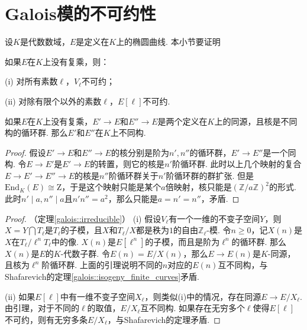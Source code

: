 \section{Galois模的不可约性}

设$K$是代数数域，$E$是定义在$K$上的椭圆曲线. 本小节要证明

\begin{cthm}
    如果$E$在$K$上没有复乘，则：

    (i) 对所有素数$\ell$，$V_{\ell}$不可约；

    (ii) 对除有限个以外的素数$\ell$，$E[\ell]$不可约.
    \label{galois::irreducible}
\end{cthm}

\begin{clem}
    如果$E$在$K$上没有复乘，$E'\to E$和$E''\to E$是两个定义在$K$上的同源，且核是不同构的循环群. 那么$E'$和$E''$在$K$上不同构.
\end{clem}

\begin{proof}
    假设$E'\to E$和$E''\to E$的核分别是阶为$n', n''$的循环群，$E'\to E''$是一个同构. 令$E\to E'$是$E'\to E$的转置，则它的核是$n'$阶循环群. 此时以上几个映射的复合$E\to E'\to E''\to E$的核是$n''$阶循环群关于$n'$阶循环群的群扩张. 但是$\mathrm{End}_K(E) \cong \mathrm{Z}$，于是这个映射只能是某个$a$倍映射，核只能是$(\mathbb{Z}/a\mathbb{Z})^2$的形式. 此时$n'\mid a, n''\mid a$且$n'n''=a^2$，那么只能是$a=n'=n''$，矛盾.
\end{proof}

\begin{proof}
    （定理\ref{galois::irreducible}）
    (i) 假设$V_{\ell}$有一个一维的不变子空间$Y$，则$X=Y\bigcap T_{\ell}$是$T_{\ell}$的子模，且$X$和$T_{\ell}/X$都是秩为$1$的自由$\mathbb{Z}_{\ell}$-模. 令$n\geq 0$，记$X(n)$是$X$在$T_{\ell} / \ell^n T_{\ell}$中的像. $X(n)$是$E[\ell^n]$的子模，而且是阶为$\ell^n$的循环群. 那么$X(n)$是$E$的$K$-代数子群. 令$E(n) = E/X(n)$，那么$E\to E(n)$是$K$-同源，且核为$\ell^n$阶循环群. 上面的引理说明不同的$n$对应的$E(n)$互不同构，与Shafarevich的定理\ref{galois::isogeny_finite_curves}矛盾.

    (ii) 如果$E[\ell]$中有一维不变子空间$X_{\ell}$，则类似(i)中的情况，存在同源$E\to E/X_{\ell}$. 由引理，对于不同的$\ell$的取值，$E/X_{\ell}$互不同构. 如果存在无穷多个$\ell$使得$E[\ell]$不可约，则有无穷多条$E/X_{\ell}$，与Shafarevich的定理矛盾.
\end{proof}
